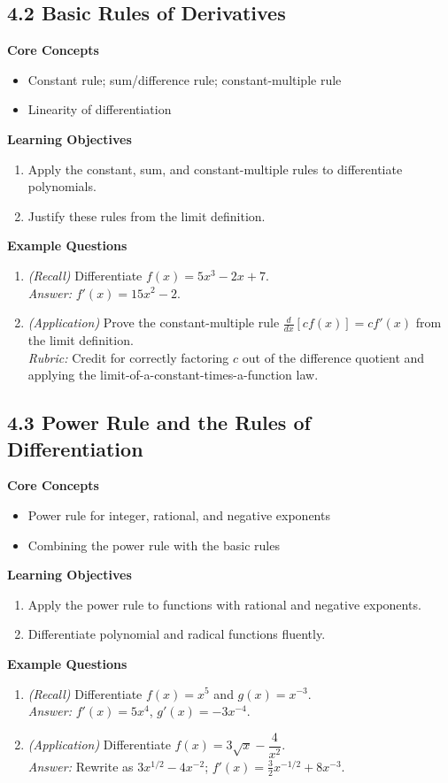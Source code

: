 \documentclass[11pt]{article}
\begin{document}
\subsection{4.2 Basic Rules of Derivatives}
\textbf{Core Concepts}
\begin{itemize}
\item Constant rule; sum/difference rule; constant-multiple rule
\item Linearity of differentiation
\end{itemize}
\textbf{Learning Objectives}
\begin{enumerate}
\item Apply the constant, sum, and constant-multiple rules to differentiate polynomials.
\item Justify these rules from the limit definition.
\end{enumerate}
\textbf{Example Questions}
\begin{enumerate}
\item \emph{(Recall)} Differentiate $f(x) = 5x^3 - 2x + 7$. \\
\textit{Answer:} $f'(x) = 15x^2-2$.
\item \emph{(Application)} Prove the constant-multiple rule $\frac{d}{dx}[cf(x)] = cf'(x)$ from the limit definition. \\
\textit{Rubric:} Credit for correctly factoring $c$ out of the difference quotient and applying the limit-of-a-constant-times-a-function law.
\end{enumerate}

\subsection{4.3 Power Rule and the Rules of Differentiation}
\textbf{Core Concepts}
\begin{itemize}
\item Power rule for integer, rational, and negative exponents
\item Combining the power rule with the basic rules
\end{itemize}
\textbf{Learning Objectives}
\begin{enumerate}
\item Apply the power rule to functions with rational and negative exponents.
\item Differentiate polynomial and radical functions fluently.
\end{enumerate}
\textbf{Example Questions}
\begin{enumerate}
\item \emph{(Recall)} Differentiate $f(x) = x^{5}$ and $g(x)=x^{-3}$. \\
\textit{Answer:} $f'(x)=5x^4$, $g'(x) = -3x^{-4}$.
\item \emph{(Application)} Differentiate $f(x) = 3\sqrt{x} - \dfrac{4}{x^2}$. \\
\textit{Answer:} Rewrite as $3x^{1/2}-4x^{-2}$; $f'(x) = \tfrac{3}{2}x^{-1/2}+8x^{-3}$.
\end{enumerate}
\end{document}
